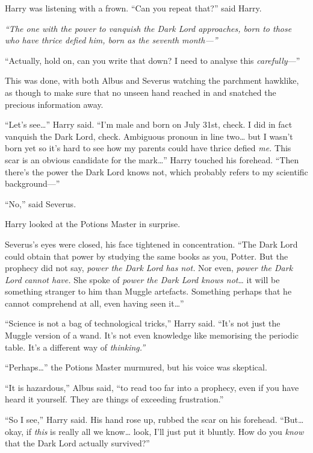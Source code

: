Harry was listening with a frown. ``Can you repeat that?'' said Harry.

\emph{``The one with the power to vanquish the Dark Lord approaches,
born to those who have thrice defied him, born as the seventh
month---''}

``Actually, hold on, can you write that down? I need to analyse this
\emph{carefully}---''

This was done, with both Albus and Severus watching the parchment
hawklike, as though to make sure that no unseen hand reached in and
snatched the precious information away.

``Let's see\ldots{}'' Harry said. ``I'm male and born on July 31st,
check. I did in fact vanquish the Dark Lord, check. Ambiguous pronoun in
line two\ldots{} but I wasn't born yet so it's hard to see how my
parents could have thrice defied \emph{me.} This scar is an obvious
candidate for the mark\ldots{}'' Harry touched his forehead. ``Then
there's the power the Dark Lord knows not, which probably refers to my
scientific background---''

``No,'' said Severus.

Harry looked at the Potions Master in surprise.

Severus's eyes were closed, his face tightened in concentration. ``The
Dark Lord could obtain that power by studying the same books as you,
Potter. But the prophecy did not say, \emph{power the Dark Lord has
not.} Nor even, \emph{power the Dark Lord cannot have.} She spoke of
\emph{power the Dark Lord knows not}\ldots{} it will be something
stranger to him than Muggle artefacts. Something perhaps that he cannot
comprehend at all, even having seen it\ldots{}''

``Science is not a bag of technological tricks,'' Harry said. ``It's not
just the Muggle version of a wand. It's not even knowledge like
memorising the periodic table. It's a different way of
\emph{thinking.''}

``Perhaps\ldots{}'' the Potions Master murmured, but his voice was
skeptical.

``It is hazardous,'' Albus said, ``to read too far into a prophecy, even
if you have heard it yourself. They are things of exceeding
frustration.''

``So I see,'' Harry said. His hand rose up, rubbed the scar on his
forehead. ``But\ldots{} okay, if \emph{this} is really all we
know\ldots{} look, I'll just put it bluntly. How do you \emph{know} that
the Dark Lord actually survived?''

